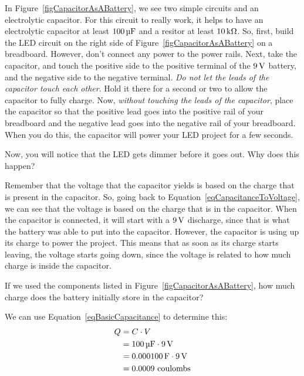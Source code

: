 
In Figure~\ref{figCapacitorAsABattery}, we see two simple circuits and an electrolytic capacitor.
For this circuit to really work, it helps to have an electrolytic capacitor at least $100\,\si{\micro\farad}$ and a resitor at least $10\,\si{\kilo\ohm}$.
So, first, build the LED circuit on the right side of Figure~\ref{figCapacitorAsABattery} on a breadboard.
However, don't connect any power to the power rails.
Next, take the capacitor, and touch the positive side to the positive terminal of the $9\,\si{\volt}$ battery, and the negative side to the negative terminal.
\emph{Do not let the leads of the capacitor touch each other}.
Hold it there for a second or two to allow the capacitor to fully charge.
Now, \emph{without touching the leads of the capacitor}, place the capacitor so that the positive lead goes into the positive rail of your breadboard and the negative lead goes into the negative rail of your breadboard.
When you do this, the capacitor will power your LED project for a few seconds.

Now, you will notice that the LED gets dimmer before it goes out.  
Why does this happen?

Remember that the voltage that the capacitor yields is based on the charge that is present in the capacitor.
So, going back to Equation~\ref{eqCapacitanceToVoltage}, we can see that the voltage is based on the charge that is in the capacitor.
When the capacitor is connected, it will start with a $9\,\si{\volt}$ discharge, since that is what the battery was able to put into the capacitor.
However, the capacitor is using up its charge to power the project.
This means that as soon as its charge starts leaving, the voltage starts going down, since the voltage is related to how much charge is inside the capacitor.

\begin{exampleprob}
If we used the components listed in Figure~\ref{figCapacitorAsABattery}, how much charge does the battery initially store in the capacitor?

We can use Equation~\ref{eqBasicCapacitance} to determine this:
\begin{align*}
Q &= C\cdot V \\
  &= 100\,\si{\micro\farad}\cdot 9\,\si{\volt} \\
  &= 0.000100\,\si{\farad}\cdot 9\,\si{\volt} \\
  &= 0.0009 \textrm{ coulombs}
\end{align*}
\end{exampleprob}

